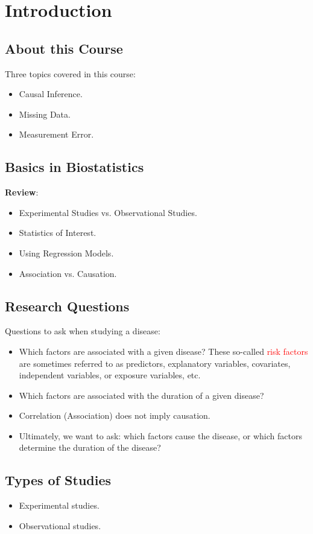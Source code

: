 \chapter{Introduction}
\section*{About this Course}
Three topics covered in this course:
\begin{itemize}
    \item Causal Inference.
    \item Missing Data.
    \item Measurement Error.
\end{itemize}
\section*{Basics in Biostatistics}
\textbf{Review}:
\begin{itemize}
    \item Experimental Studies vs. Observational Studies.
    \item Statistics of Interest.
    \item Using Regression Models.
    \item Association vs. Causation.
\end{itemize}
\section*{Research Questions}
Questions to ask when studying a disease:
\begin{itemize}
    \item Which factors are associated with a given disease? These
          so-called \textcolor{Red}{risk factors} are sometimes referred to as predictors,
          explanatory variables, covariates, independent variables, or
          exposure variables, etc.
    \item Which factors are associated with the duration of a given
          disease?
    \item Correlation (Association) does not imply causation.
    \item Ultimately, we want to ask: which factors cause the disease, or
          which factors determine the duration of the disease?
\end{itemize}
\section*{Types of Studies}
\begin{itemize}
    \item Experimental studies.
    \item Observational studies.
\end{itemize}
